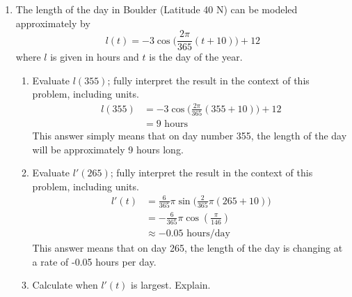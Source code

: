 \documentclass{article}
\begin{document}
\begin{enumerate}
\begin{center}
\begin{minipage}[l]{0.45\linewidth}
\begin{tabular}{c|cccc}
				\end{tabular}
		\end{minipage}
	\end{center}
	\begin{center}
		(The function $f(x)$ is piecewise linear)
	\end{center}
		\begin{enumerate}
			\item Given $h(x)=f(g(x))$, find $h'(1)$.
			\item Given $k(x)=g(f(x))$, find $k'(3)$.
			\item Given $l(x)=g(g(x))$, find $l'(x)$.\newline
			$g'(g(x))\cdot g'(x)$
			\item Given $m(x)=\sqrt{f(x)}$, find $m'(1)$.\newline
			$\frac{1}{\sqrt{2}}$
		\end{enumerate}
	\item The length of the day in Boulder (Latitude 40 N) can be modeled approximately by $$l(t)=-3\cos\Big(\frac{2\pi}{365}(t+10)\Big)+12$$ where $l$ is given in hours and $t$ is the day of the year.
	\begin{enumerate}
		\item Evaluate $l(355)$; fully interpret the result in the context of this problem, including units.
		$$\begin{align}
			l(355)&=-3\cos\Big(\frac{2\pi}{365}(355+10)\Big)+12\\
			&=9 \text{ hours}
		\end{align}$$
		This answer simply means that on day number 355, the length of the day will be approximately 9 hours long.
		\item Evaluate $l'(265)$; fully interpret the result in the context of this problem, including units.
		$$\begin{align}
			l'(t)&=\frac{6}{365}\pi \sin\Big(\frac{2}{365}\pi (265+10)\Big)\\
			&=-\frac{6}{365}\pi \cos(\frac{\pi}{146})\\
			&\approx -0.05 \text { hours/day}
		\end{align}$$
		This answer means that on day 265, the length of the day is changing at a rate of -0.05 hours per day.
		\item Calculate when $l'(t)$ is largest. Explain.
		\begin{center}
		\pgfplotsset{width=14cm,height=7cm,ymax=0.06,ymin=-0.06}

\end{center}
\end{enumerate}
\end{enumerate}
\end{document}
